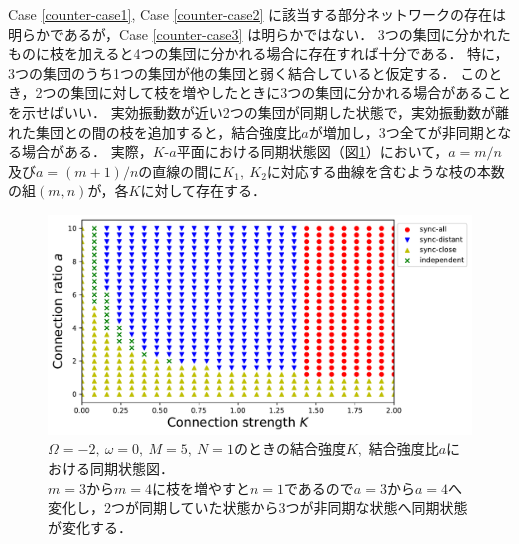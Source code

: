 \documentclass[../main]{subfiles}
\begin{document}
Case \ref{counter-case1}, Case \ref{counter-case2} に該当する部分ネットワークの存在は明らかであるが，Case \ref{counter-case3} は明らかではない．
3つの集団に分かれたものに枝を加えると4つの集団に分かれる場合に存在すれば十分である．
特に，3つの集団のうち1つの集団が他の集団と弱く結合していると仮定する．
このとき，2つの集団に対して枝を増やしたときに3つの集団に分かれる場合があることを示せばいい．
実効振動数が近い2つの集団が同期した状態で，実効振動数が離れた集団との間の枝を追加すると，結合強度比$a$が増加し，3つ全てが非同期となる場合がある．
実際，$K$-$a$平面における同期状態図（図\ref{fig:3body-phase-m5}）において，$a=m/n$及び$a=(m+1)/n$の直線の間に$K_1,\ K_2$に対応する曲線を含むような枝の本数の組$(m,n)$が，各$K$に対して存在する．

\begin{figure}[tbp]
    \centering
    \includegraphics[width=135mm]{./images/three-body-phase-m5.pdf}
    \centering
    \caption{$\Omega=-2,\ \omega=0,\ M=5,\ N=1$のときの結合強度$K$,\ 結合強度比$a$における同期状態図．\\
    $m=3$から$m=4$に枝を増やすと$n=1$であるので$a=3$から$a=4$へ変化し，2つが同期していた状態から3つが非同期な状態へ同期状態が変化する．}
    \label{fig:3body-phase-m5}
\end{figure}

\end{document}
